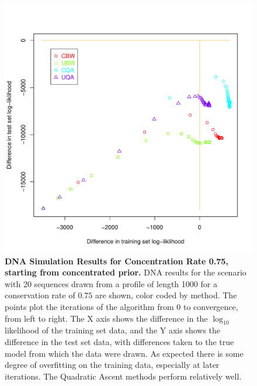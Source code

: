 \documentclass[preprint,12pt,authoryear]{elsarticle}
\begin{document}
\begin{figure}[htp]
\centering
\includegraphics[scale=.85]{DNA_priorstart_results_75.pdf}
\caption{\textbf{DNA Simulation Results for Concentration Rate 0.75, starting from concentrated prior.}  DNA results for the scenario with 20 sequences drawn from a profile of length 1000 for a conservation rate of $0.75$ are shown, color coded by method.  The points plot the iterations of the algorithm from 0 to convergence, from left to right.  The X axis shows the difference in the $\log_{10}$ likelihood of the training set data, and the Y axis shows the difference in the test set data, with differences taken to the true model from which the data were drawn.  As expected there is some degree of overfitting on the training data, especially at later iterations. The Quadratic Ascent methods perform relatively well.}
\label{fig:DNA_priorstart_results_75}
\end{figure}
\end{document}
